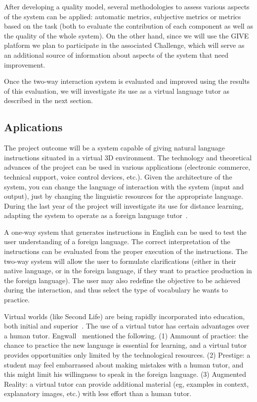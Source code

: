 After developing a quality model, several methodologies to assess
various aspects of the system can be applied: automatic metrics,
subjective metrics or metrics based on the task (both to
evaluate the contribution of each component as well as the quality of the whole
system). On the other hand, since we will use the GIVE platform  we plan to
participate in the associated Challenge, which will serve as an additional
source of information about aspects of the system that need
improvement.

Once the two-way interaction system is evaluated and improved using the results
of this evaluation, we will investigate its use as a virtual language tutor as
described in the next section.

\subsection{Aplications}

The project outcome will be a system capable of giving natural language
instructions situated in a virtual 3D environment. The technology and
theoretical advances of the project can be used in various applications
(electronic commerce, technical support, voice control devices, etc.). 
Given the architecture of the system, you can change the language of interaction
with the system (input and output), just by changing the linguistic resources
for the appropriate language. During
the last year of the project will investigate its use for distance learning,
adapting the system to operate as a foreign language
tutor~\cite{Eskenazi09,Wik09}.



A one-way system that generates instructions in English can be used to test the
user understanding of a foreign language. The correct interpretation of the
instructions can be evaluated from the proper execution of the instructions. The
two-way system will allow the user to formulate clarifications (either in their
native language, or in the foreign language, if they want to practice
production in the foreign language). The user may also redefine the
objective to be achieved during the interaction, and thus select the type of
vocabulary he wants to practice.

Virtual worlds (like Second Life) are being rapidly incorporated into
education, both initial and superior~\cite{Doswell05,molk:lear09}. The use of a
virtual tutor has certain advantages over a human tutor.
Engwall~ mentioned the following. (1) Ammount of
practice: the chance to practice the new language is essential for learning, and
a virtual tutor provides opportunities only limited by the
technological resources. (2) Prestige: a student
may feel embarrassed about making mistakes with a human tutor, and this
might limit his willingness to speak in the foreign language. (3) Augmented
Reality: a virtual
tutor can provide additional material (eg, examples in context, explanatory
images, etc.) with less effort than a human tutor.

